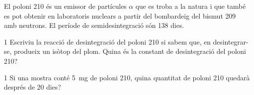 El poloni 210 és un emissor de partícules $\alpha$ que es troba a la natura i que també es pot obtenir en laboratoris nuclears a partir del bombardeig del bismut 209 amb neutrons. El període de semidesintegració són 138 dies.

\begin{apartat}{1}
Escriviu la reacció de desintegració del poloni 210 si sabem que, en desintegrar-se, produeix un isòtop del plom. Quina és la constant de desintegració del poloni 210?
\end{apartat}

\begin{apartat}{1}
Si una mostra conté 5~mg de poloni 210, quina quantitat de poloni 210 quedarà després de 20 dies?
\end{apartat}

